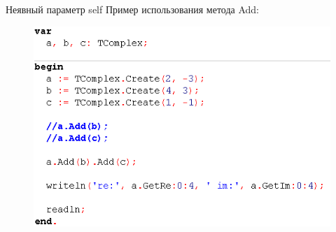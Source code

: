 \documentclass{beamer}
\begin{document}
\begin{frame}{Неявный параметр self}
Пример использования метода Add:
\begin{figure}[h]
\centering
\includegraphics[scale=0.5]{images/lec06-pic03.png}
\end{figure}
\end{frame}
\end{document}
